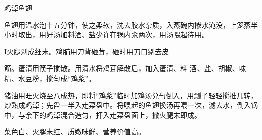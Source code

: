 \begin{recipe}{鸡淖鱼翅}

\ingredients


\cooking

\step 鱼翅用温水泡十五分钟，使之柔软，洗去胶水杂质，入蒸碗内掺水淹没，上笼蒸半小时取出，用好汤加料酒、盐少许在锅内汆两次，用汤喂起待用。

I火腿剁成细末。鸡脯用刀背砸茸，砸时用刀口剔去皮

筋。蛋清用筷子搅散。用清水将鸡茸解散后，加入蛋清、料 酒、盐、胡椒、味精、水豆粉，搅匀成“鸡浆”。

\step 猪油用旺火烧至八成热，即将“鸡浆”临时加鸡汤兑勻倒入，用瓢子轻轻搅推几转，炒熟成鸡淖；先舀一半入走菜盘中。将喂起的鱼翅换汤再喂一次，滤去水，倒入锅中，与余下的鸡淖混合造匀，扞入走菜盘面上，撒火腿末即成。

\notes

菜色白、火腿末红、质嫩味鲜、营养价值高。

\end{recipe}

